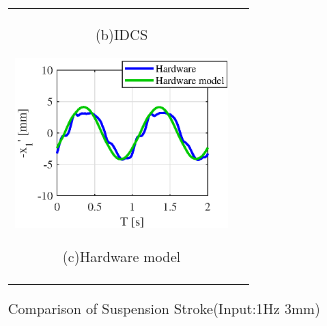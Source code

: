 \documentclass[a4paper,12pt]{article_vdlab_sotsuron}
\begin{document}
\begin{figure}[h]
\begin{tabular}{cc}
\begin{minipage}{0.33\hsize}
      \begin{center}
      \ (b)IDCS\
    \end{center}
  \end{minipage}
  \begin{minipage}{0.33\hsize}
  \begin{center}
    \includegraphics[height=45mm]{figure/hils_linear_idcs_3_1.eps}
    \end{center}
    \begin{center}
    \ (c)Hardware model\
    \end{center}
  \end{minipage}
  \end{tabular}
\vspace*{2mm}
  \caption{Comparison of Suspension Stroke(Input:1Hz 3mm)}
    \label{fig:hils_3_1}
\end{figure}
\vspace{5mm}
\end{document}
